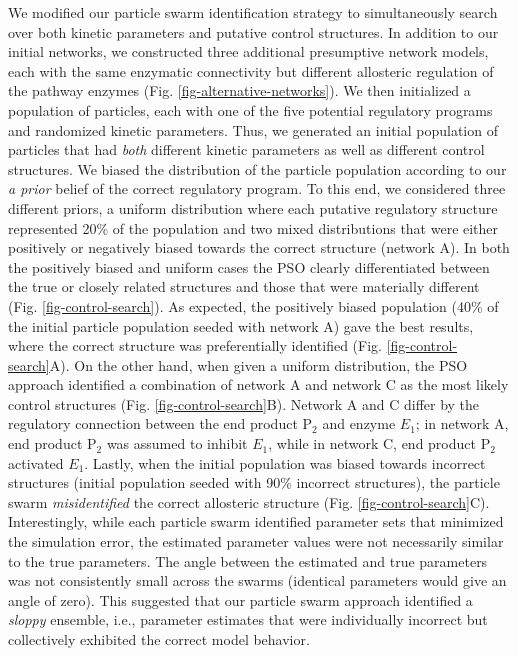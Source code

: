 \documentclass[12pt]{article}
\begin{document}
We modified our particle swarm identification strategy to simultaneously search over both kinetic parameters and putative control structures. 
In addition to our initial networks, we constructed three additional presumptive network models, each with the same enzymatic connectivity but different allosteric regulation of the pathway enzymes (Fig. \ref{fig-alternative-networks}). 
We then initialized a population of particles, each with one of the five potential regulatory programs and randomized kinetic parameters. 
Thus, we generated an initial population of particles that had \textit{both} different kinetic parameters as well as different control structures. 
We biased the distribution of the particle population according to our \textit{a prior} belief of the correct regulatory program. 
To this end, we considered three different priors, a uniform distribution where each putative regulatory structure represented 20\% of the population and two mixed distributions that were either positively or negatively biased towards the correct structure (network A). 
In both the positively biased and uniform cases the PSO clearly differentiated between the true or closely related structures and those that were materially different (Fig. \ref{fig-control-search}). 
As expected, the positively biased population (40\% of the initial particle population seeded with network A) gave the best results, where the correct structure was preferentially identified (Fig. \ref{fig-control-search}A). 
On the other hand, when given a uniform distribution, the PSO approach identified a combination of network A and network C as the most likely control structures (Fig. \ref{fig-control-search}B). 
Network A and C differ by the regulatory connection between the end product P$_2$ and enzyme $E_{1}$; in network A, end product P$_{2}$ was assumed to inhibit $E_{1}$, while in network C, end product P$_{2}$ activated $E_{1}$.  
Lastly, when the initial population was biased towards incorrect structures (initial population seeded with 90\% incorrect structures), the particle swarm \textit{misidentified} the correct allosteric structure (Fig. \ref{fig-control-search}C). 
Interestingly, while each particle swarm identified parameter sets that minimized the simulation error, the estimated parameter values were not necessarily similar to the true parameters. 
The angle between the estimated and true parameters was not consistently small across the swarms (identical parameters would give an angle of zero). 
This suggested that our particle swarm approach identified a \textit{sloppy} ensemble, i.e., parameter estimates that were individually incorrect but collectively exhibited the correct model behavior.  
\end{document}
